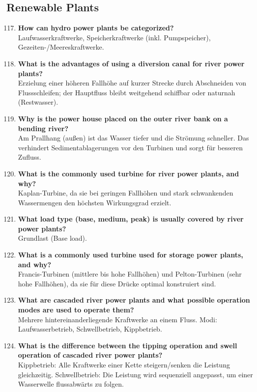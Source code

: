 \documentclass{article}
\begin{document}
\subsection*{Renewable Plants}
\begin{enumerate}
    \setcounter{enumi}{116}
    \item \textbf{How can hydro power plants be categorized?} \\
    Laufwasserkraftwerke, Speicherkraftwerke (inkl. Pumpspeicher), Gezeiten-/Meereskraftwerke.
    \item \textbf{What is the advantages of using a diversion canal for river power plants?} \\
    Erzielung einer höheren Fallhöhe auf kurzer Strecke durch Abschneiden von Flussschleifen; der Hauptfluss bleibt weitgehend schiffbar oder naturnah (Restwasser).
    \item \textbf{Why is the power house placed on the outer river bank on a bending river?} \\
    Am Prallhang (außen) ist das Wasser tiefer und die Strömung schneller. Das verhindert Sedimentablagerungen vor den Turbinen und sorgt für besseren Zufluss.
    \item \textbf{What is the commonly used turbine for river power plants, and why?} \\
    Kaplan-Turbine, da sie bei geringen Fallhöhen und stark schwankenden Wassermengen den höchsten Wirkungsgrad erzielt.
    \item \textbf{What load type (base, medium, peak) is usually covered by river power plants?} \\
    Grundlast (Base load).
    \item \textbf{What is a commonly used turbine used for storage power plants, and why?} \\
    Francis-Turbinen (mittlere bis hohe Fallhöhen) und Pelton-Turbinen (sehr hohe Fallhöhen), da sie für diese Drücke optimal konstruiert sind.
    \item \textbf{What are cascaded river power plants and what possible operation modes are used to operate them?} \\
    Mehrere hintereinanderliegende Kraftwerke an einem Fluss. Modi: Laufwasserbetrieb, Schwellbetrieb, Kippbetrieb.
    \item \textbf{What is the difference between the tipping operation and swell operation of cascaded river power plants?} \\
    Kippbetrieb: Alle Kraftwerke einer Kette steigern/senken die Leistung gleichzeitig. Schwellbetrieb: Die Leistung wird sequenziell angepasst, um einer Wasserwelle flussabwärts zu folgen.

\end{enumerate}
\end{document}
